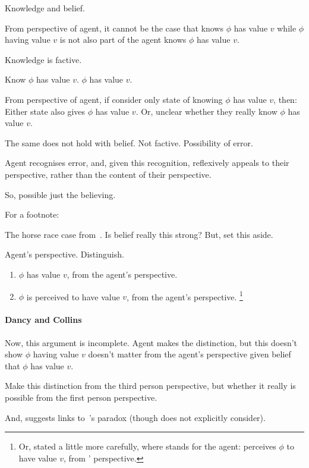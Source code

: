 \begin{note}
  Knowledge and belief.

  From perspective of agent, it cannot be the case that knows \(\phi\) has value \(v\) while \(\phi\) having value \(v\) is not also part of \qWhy{} the agent knows \(\phi\) has value \(v\).

  Knowledge is factive.

  Know \(\phi\) has value \(v\).
  \(\phi\) has value \(v\).

  From perspective of agent, if consider only state of knowing \(\phi\) has value \(v\), then:
  Either state also gives \(\phi\) has value \(v\).
  Or, unclear whether they really know \(\phi\) has value \(v\).

  The same does not hold with belief.
  Not factive.
  Possibility of error.

  Agent recognises error, and, given this recognition, reflexively appeals to their perspective, rather than the content of their perspective.

  So, possible just the believing.
\end{note}

\begin{note}
  \color{red}
  For a footnote:

  The horse race case from~\textcite{Hawthorne:2016wv}.
  Is belief really this strong?
  But, set this aside.
\end{note}

\begin{note}
  Agent's perspective.
  Distinguish.

  \begin{enumerate}
  \item
    \(\phi\) has value \(v\), from the agent's perspective.
  \item
    \(\phi\) is perceived to have value \(v\), from the agent's perspective.%
    \footnote{
      Or, stated a little more carefully, where \vAgent{} stands for the agent:
      \vAgent{} perceives \(\phi\) to have value \(v\), from \vAgent{}' perspective.
    }
  \end{enumerate}
\end{note}

\paragraph{Dancy and Collins}

\begin{note}
  Now, this argument is incomplete.
  Agent makes the distinction, but this doesn't show \(\phi\) having value \(v\) doesn't matter from the agent's perspective given belief that \(\phi\) has value \(v\).

  Make this distinction from the third person perspective, but whether it really is possible from the first person perspective.

  And, \citeauthor{Dancy:2000aa} suggests links to~\citeauthor{Moore:1993wk}'s paradox (though \citeauthor{Collins:1997wn} does not explicitly consider).
\end{note}

